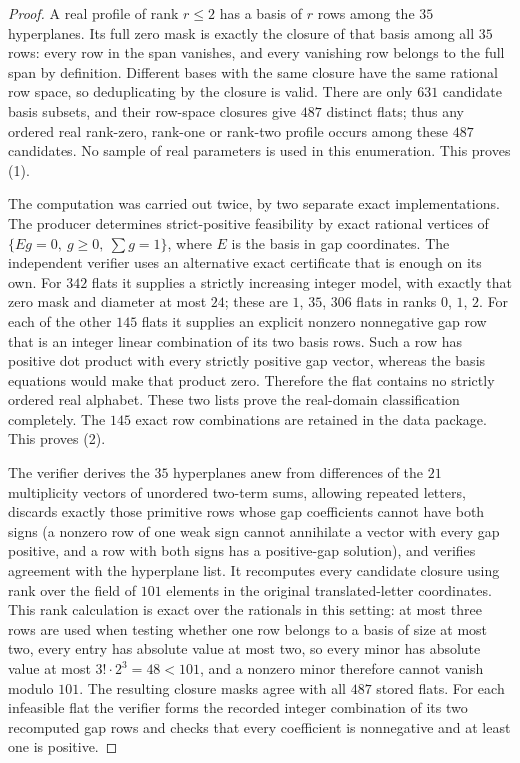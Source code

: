 \documentclass[11pt,reqno]{amsart}
\theoremstyle{plain}
\theoremstyle{definition}
\theoremstyle{plain}
\theoremstyle{plain}
\theoremstyle{plain}
\theoremstyle{plain}
\theoremstyle{plain}
\theoremstyle{plain}
\theoremstyle{definition}
\theoremstyle{definition}
\theoremstyle{definition}
\theoremstyle{plain}
\begin{document}
\begin{proof}
A real profile of rank $r\le2$ has a basis of $r$ rows among the $35$
hyperplanes. Its full zero mask is exactly the closure of that basis among
all $35$ rows: every row in the span vanishes, and every vanishing row
belongs to the full span by definition. Different bases with the same
closure have the same rational row space, so deduplicating by the closure is
valid. There are only $631$ candidate basis subsets, and their row-space
closures give $487$ distinct flats; thus any ordered real rank-zero,
rank-one or rank-two profile occurs among these $487$ candidates. No sample
of real parameters is used in this enumeration. This proves (1).

The computation was carried out twice, by two separate exact
implementations. The producer determines strict-positive feasibility by exact
rational vertices of $\{Eg=0,\ g\ge0,\ \sum g=1\}$, where $E$ is the basis in
gap coordinates. The independent verifier uses an alternative exact
certificate that is enough on its own. For $342$ flats it supplies a strictly
increasing integer model, with exactly that zero mask and diameter at most
$24$; these are $1$, $35$, $306$ flats in ranks $0$, $1$, $2$. For each of
the other $145$ flats it supplies an explicit nonzero nonnegative gap row
that is an integer linear combination of its two basis rows. Such a row has
positive dot product with every strictly positive gap vector, whereas the
basis equations would make that product zero. Therefore the flat contains no
strictly ordered real alphabet. These two lists prove the real-domain
classification completely. The $145$ exact row combinations are retained in
the data package. This proves (2).

The verifier derives the $35$ hyperplanes anew from differences of the $21$
multiplicity vectors of unordered two-term sums, allowing repeated letters, discards exactly those primitive rows
whose gap coefficients cannot have both signs (a nonzero row of one weak sign
cannot annihilate a vector with every gap positive, and a row with both signs
has a positive-gap solution), and verifies agreement with the hyperplane
list. It recomputes every candidate closure using rank over the field of
$101$ elements in the original translated-letter coordinates. This rank
calculation is exact over the rationals in this setting: at most three rows
are used when testing whether one row belongs to a basis of size at most two,
every entry has absolute value at most two, so every minor has absolute value
at most $3!\cdot2^3=48<101$, and a nonzero minor therefore cannot vanish
modulo $101$. The resulting closure masks agree with all $487$ stored flats.
For each infeasible flat the verifier forms the recorded integer combination
of its two recomputed gap rows and checks that every coefficient is
nonnegative and at least one is positive.


\end{proof}
\end{document}
